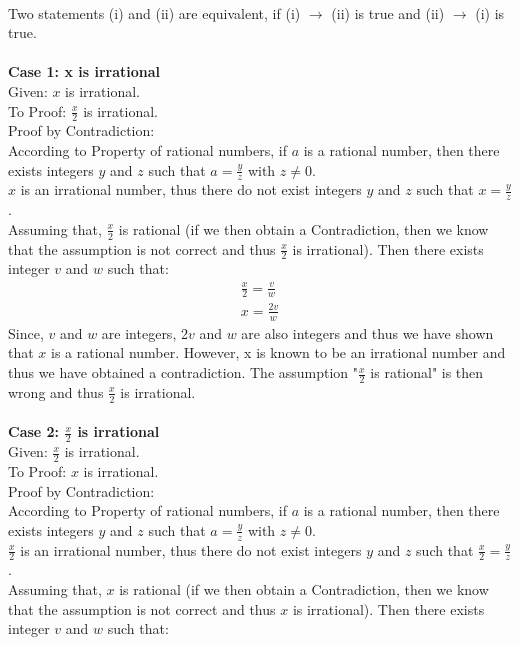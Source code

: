 \documentclass[addpoints]{exam}
\begin{document}
\begin{questions}
  \begin{solution}\\
    Two statements (i) and (ii) are equivalent, if (i) $\rightarrow$ (ii) is true and (ii) $\rightarrow$ (i) is true.\\\\
    \textbf{Case 1: x is irrational}\\
    Given: $x$ is irrational.\\
    To Proof: $\frac{x}{2}$ is irrational.\\
    Proof by Contradiction:\\
    According to Property of rational numbers, if $a$ is a rational number, then there exists integers $y$ and $z$ such that $a = \frac{y}{z}$ with $z \neq 0$.\\
    $x$ is an irrational number, thus there do not exist integers $y$ and $z$ such that $x = \frac{y}{z}$.\\
    Assuming that, $\frac{x}{2}$ is rational (if we then obtain a Contradiction, then we know that the assumption is not correct and thus $\frac{x}{2}$ is irrational). Then there exists integer $v$ and $w$ such that:\\
    \begin{align}
      \frac{x}{2} = \frac{v}{w} \\
      x = \frac{2v}{w}
    \end{align}
    Since, $v$ and $w$ are integers, 2$v$ and $w$ are also integers and thus we have shown that $x$ is a rational number. However, x is known to be an irrational number and thus we have obtained a contradiction. The assumption "$\frac{x}{2}$ is rational" is then wrong and thus $\frac{x}{2}$ is irrational.\\\\
    \textbf{Case 2: $\frac{x}{2}$ is irrational}\\
    Given: $\frac{x}{2}$ is irrational.\\
    To Proof: $x$ is irrational.\\
    Proof by Contradiction:\\
    According to Property of rational numbers, if $a$ is a rational number, then there exists integers $y$ and $z$ such that $a = \frac{y}{z}$ with $z \neq 0$.\\
    $\frac{x}{2}$ is an irrational number, thus there do not exist integers $y$ and $z$ such that $\frac{x}{2} = \frac{y}{z}$.\\
    Assuming that, $x$ is rational (if we then obtain a Contradiction, then we know that the assumption is not correct and thus $x$ is irrational). Then there exists integer $v$ and $w$ such that:\\

\end{solution}
\end{questions}
\end{document}
